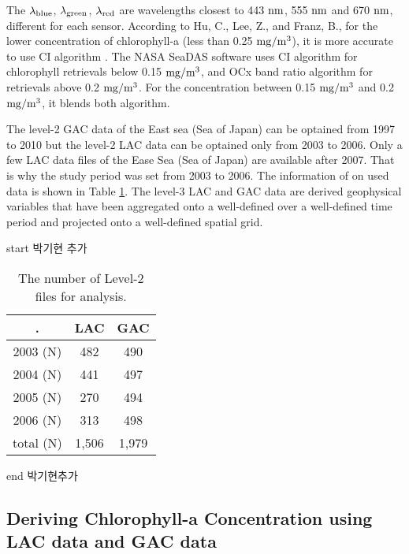 The $\rm {\lambda}_{blue}$, $\rm {\lambda}_{green}$, $\rm {\lambda}_{red}$ are wavelengths closest to 443 $\rm nm$, 555 $\rm nm$ and 670 $\rm nm$, different for each sensor. According to Hu, C., Lee, Z., and Franz, B., for the lower concentration of chlorophyll-a (less than 0.25 $\rm mg/m^3$), it is more accurate to use CI algorithm \cite{hu2012chlorophyll}. The NASA SeaDAS software uses CI algorithm for chlorophyll retrievals below 0.15 $\rm mg/m^3$, and OCx band ratio algorithm for retrievals above 0.2 $\rm mg/m^3$. For the concentration between 0.15 $\rm mg/m^3$ and 0.2 $\rm mg/m^3$, it blends both algorithm.

The level-2 GAC data of the East sea (Sea of Japan) can be optained from 1997 to 2010 but the level-2 LAC data can be optained only from 2003 to 2006. Only a few LAC data files of the Ease Sea (Sea of Japan) are available after 2007. That is why the study period was set from 2003 to 2006. The information of on used data is shown in Table \ref{data_information}.
The level-3 LAC and GAC data are derived geophysical variables that have been aggregated onto a well-defined over a well-defined time period and projected onto a well-defined spatial grid.

start 박기현 추가
 \begin{table}[h]
	\caption{The number of Level-2 files for analysis.}
	\label{data_information}
	\centering
	\begin{tabular}{c | c | c }
		\hline \setlength{\arrayrulewidth}{3.5pt}. 
			& LAC  & GAC \\ \hline
		2003 (N) & 482 & 490 \\ \hline
		2004 (N) & 441 & 497 \\ \hline
		2005 (N) & 270 & 494 \\ \hline
		2006 (N) & 313 & 498 \\ \hline
		total (N) & 1,506 & 1,979 \\ \hline
	\end{tabular}
\end{table}
end 박기현추가

\hfill \break
\hfill \break


 \subsection{Deriving Chlorophyll-a Concentration using LAC data and GAC data}
 
